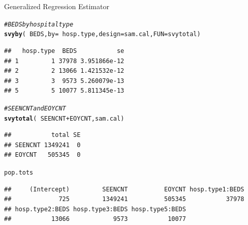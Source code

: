 \documentclass[10pt]{beamer}\usepackage[]{graphicx}\usepackage[]{color}
\makeatletter
\newcommand{\hlstr}[1]{\textcolor[rgb]{0.192,0.494,0.8}{#1}}%
\newcommand{\hlcom}[1]{\textcolor[rgb]{0.678,0.584,0.686}{\textit{#1}}}%
\newcommand{\hlopt}[1]{\textcolor[rgb]{0,0,0}{#1}}%
\newcommand{\hlstd}[1]{\textcolor[rgb]{0.345,0.345,0.345}{#1}}%
\newcommand{\hlkwb}[1]{\textcolor[rgb]{0.69,0.353,0.396}{#1}}%
\newcommand{\hlkwc}[1]{\textcolor[rgb]{0.333,0.667,0.333}{#1}}%
\newcommand{\hlkwd}[1]{\textcolor[rgb]{0.737,0.353,0.396}{\textbf{#1}}}%
\newenvironment{kframe}{%
 \def\at@end@of@kframe{}%
 \ifinner\ifhmode%
  \def\at@end@of@kframe{\end{minipage}}%
  \begin{minipage}{\columnwidth}%
 \fi\fi%
 \def\FrameCommand##1{\hskip\@totalleftmargin \hskip-\fboxsep
 \colorbox{shadecolor}{##1}\hskip-\fboxsep
     \hskip-\linewidth \hskip-\@totalleftmargin \hskip\columnwidth}%
 \MakeFramed {\advance\hsize-\width
   \@totalleftmargin\z@ \linewidth\hsize
   \@setminipage}}%
 {\par\unskip\endMakeFramed%
 \at@end@of@kframe}
\newenvironment{knitrout}{}{} %
\makeatother
\begin{document}
\begin{frame}[fragile]{Generalized Regression Estimator}
\begin{lrbox}{\mysavebox}
\begin{knitrout}\footnotesize
{}\color{fgcolor}\begin{kframe}
\begin{alltt}
\hlcom{#BEDS by hospital type}
\hlkwd{svyby}\hlstd{(}\hlopt{~}\hlstd{BEDS,} \hlkwc{by}\hlstd{=}\hlopt{~}\hlstd{hosp.type,} \hlkwc{design}\hlstd{=sam.cal,} \hlkwc{FUN}\hlstd{=svytotal)}
\end{alltt}
\begin{verbatim}
##   hosp.type  BEDS           se
## 1         1 37978 3.951866e-12
## 2         2 13066 1.421532e-12
## 3         3  9573 5.260079e-13
## 5         5 10077 5.811345e-13
\end{verbatim}
\begin{alltt}
\hlcom{#SEENCNT and EOYCNT}
\hlkwd{svytotal}\hlstd{(}\hlopt{~}\hlstd{SEENCNT}\hlopt{+}\hlstd{EOYCNT, sam.cal)}
\end{alltt}
\begin{verbatim}
##           total SE
## SEENCNT 1349241  0
## EOYCNT   505345  0
\end{verbatim}
\begin{alltt}
\hlstd{pop.tots}
\end{alltt}
\begin{verbatim}
##     (Intercept)         SEENCNT          EOYCNT hosp.type1:BEDS 
##             725         1349241          505345           37978 
## hosp.type2:BEDS hosp.type3:BEDS hosp.type5:BEDS 
##           13066            9573           10077
\end{verbatim}
\end{kframe}
\end{knitrout}
\end{lrbox}

\end{frame}
\end{document}
